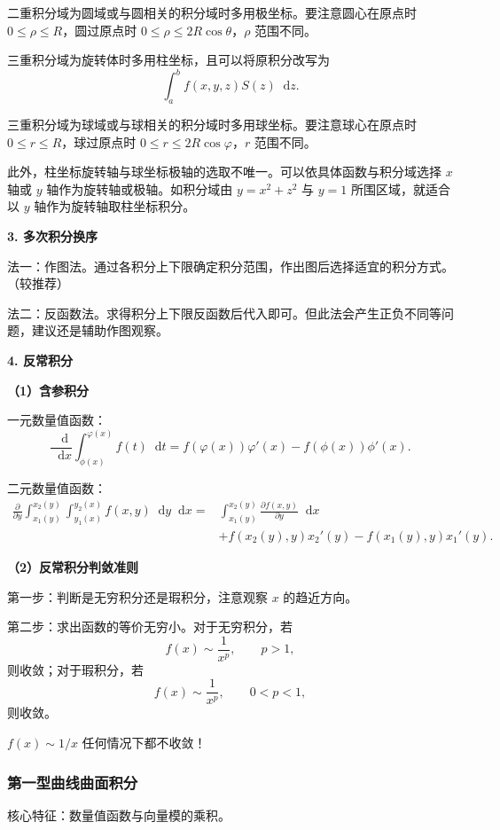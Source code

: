\documentclass[UTF8,fontset=fandol,zihao=5]{ctexart}
\newcommand{\dd}{\mathop{}\!\mathrm{d}}
\begin{document}
二重积分域为圆域或与圆相关的积分域时多用极坐标。要注意圆心在原点时 $0\leq\rho\leq R$，圆过原点时 $0\leq\rho\leq2R\cos\theta$，$\rho$ 范围不同。

三重积分域为旋转体时多用柱坐标，且可以将原积分改写为
\[
\int_a^b f(x,y,z)S(z)\dd z.
\]

三重积分域为球域或与球相关的积分域时多用球坐标。要注意球心在原点时 $0\leq r\leq R$，球过原点时 $0\leq r\leq2R\cos\varphi$，$r$ 范围不同。

此外，柱坐标旋转轴与球坐标极轴的选取不唯一。可以依具体函数与积分域选择 $x$ 轴或 $y$ 轴作为旋转轴或极轴。如积分域由 $y=x^2+z^2$ 与 $y=1$ 所围区域，就适合以 $y$ 轴作为旋转轴取柱坐标积分。

\textbf{3. 多次积分换序}

法一：作图法。通过各积分上下限确定积分范围，作出图后选择适宜的积分方式。（较推荐）

法二：反函数法。求得积分上下限反函数后代入即可。但此法会产生正负不同等问题，建议还是辅助作图观察。

\textbf{4. 反常积分}

\textbf{（1）含参积分}

一元数量值函数：
\[
\frac{\dd}{\dd x}\int_{\phi(x)}^{\varphi(x)}f(t)\dd t
=f(\varphi(x))\varphi'(x)-f(\phi(x))\phi'(x).
\]

二元数量值函数：
\[
\begin{aligned}
\frac{\partial}{\partial y}
\int_{x_1(y)}^{x_2(y)}\int_{y_1(x)}^{y_2(x)}f(x,y)\dd y\dd x
={}&\int_{x_1(y)}^{x_2(y)}\frac{\partial f(x,y)}{\partial y}\dd x\\
&+f(x_2(y),y)x_2'(y)-f(x_1(y),y)x_1'(y).
\end{aligned}
\]

\textbf{（2）反常积分判敛准则}

\begin{method}[判断反常函数敛散性]
第一步：判断是无穷积分还是瑕积分，注意观察 $x$ 的趋近方向。

第二步：求出函数的等价无穷小。对于无穷积分，若
\[
f(x)\sim\frac1{x^p},\qquad p>1,
\]
则收敛；对于瑕积分，若
\[
f(x)\sim\frac1{x^p},\qquad0<p<1,
\]
则收敛。

$f(x)\sim1/x$ 任何情况下都不收敛！
\end{method}

\subsubsection{第一型曲线曲面积分}

核心特征：数量值函数与向量模的乘积。
\end{document}
